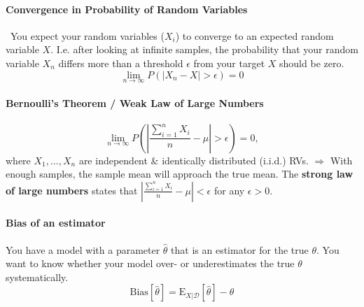 \documentclass[../main.tex]{subfiles}
\begin{document}
        \paragraph{Convergence in Probability of Random Variables}  You expect your random variables ($X_i$) to converge to an expected random variable $X$. I.e. after looking at infinite samples, the probability that your random variable $X_n$ differs more than a threshold $\epsilon$ from your target $X$ should be zero. 
                $$
                \lim_{n \rightarrow \infty} P(|X_n - X| > \epsilon) = 0
                $$

        \paragraph{Bernoulli's Theorem / Weak Law of Large Numbers}   
                $$
                \lim_{n \rightarrow \infty} P(|\frac{\sum_{i=1}^n X_i}{n} - \mu| > \epsilon) = 0,
                $$
                where $X_1,...,X_n$ are independent \& identically distributed (i.i.d.) RVs. $\Rightarrow$ With enough samples, the sample mean will approach the true mean. The \textbf{strong law of large numbers}  states that  $|\frac{\sum_{i=1}^n X_i}{n} - \mu| < \epsilon$ for any $\epsilon > 0$.

        \paragraph{Bias of an estimator}  You have a model with a parameter $\hat{\theta}$ that is an estimator for the true $\theta$. You want to know whether your model over- or underestimates the true $\theta$ systematically. 
                $$
                \text{Bias}[\hat{\theta}]=\text{E}_{X|\mathcal{D}}[\hat{\theta}]- \theta
                $$
        
\end{document}
